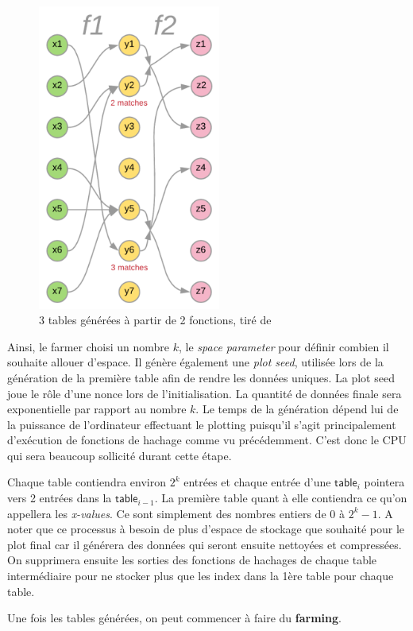\begin{figure}[H]
  \centering
  \includegraphics[width=6cm]{images/pospace_2.png}
  \caption{3 tables générées à partir de 2 fonctions, tiré de \cite{chia:construction}}
\end{figure}

Ainsi, le farmer choisi un nombre $k$, le \emph{space parameter} pour définir combien il souhaite allouer d'espace. Il génère également une \emph{plot seed}, utilisée lors de la génération de la première table afin de rendre les données uniques. La plot seed joue le rôle d'une nonce lors de l'initialisation. La quantité de données finale sera exponentielle par rapport au nombre $k$. Le temps de la génération dépend lui de la puissance de l'ordinateur effectuant le plotting puisqu'il s'agit principalement d'exécution de fonctions de hachage comme vu précédemment. C'est donc le CPU qui sera beaucoup sollicité durant cette étape. 

Chaque table contiendra environ $2^k$ entrées et chaque entrée d'une $\textsf{table}_i$ pointera vers 2 entrées dans la $\textsf{table}_{i-1}$. La première table quant à elle contiendra ce qu'on appellera les \emph{x-values}. Ce sont simplement des nombres entiers de $0$ à $2^k-1$. A noter que ce processus à besoin de plus d'espace de stockage que souhaité pour le plot final car il générera des données qui seront ensuite nettoyées et compressées. On supprimera ensuite les sorties des fonctions de hachages de chaque table intermédiaire pour ne stocker plus que les index dans la 1ère table pour chaque table.

Une fois les tables générées, on peut commencer à faire du \textbf{farming}.

